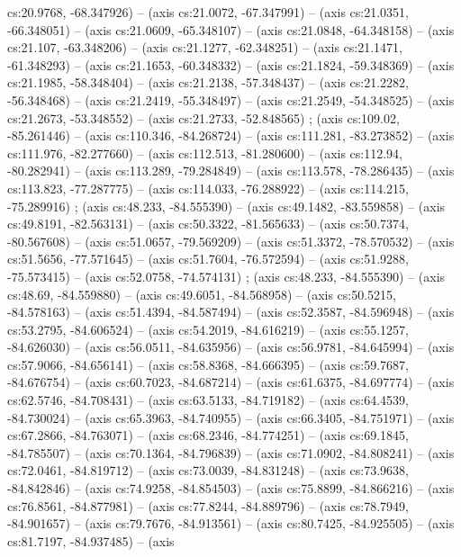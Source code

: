   cs:20.9768, -68.347926) -- (axis cs:21.0072, -67.347991) -- (axis
  cs:21.0351, -66.348051) -- (axis cs:21.0609, -65.348107) -- (axis
  cs:21.0848, -64.348158) -- (axis cs:21.107, -63.348206) -- (axis cs:21.1277,
  -62.348251) -- (axis cs:21.1471, -61.348293) -- (axis cs:21.1653,
  -60.348332) -- (axis cs:21.1824, -59.348369) -- (axis cs:21.1985,
  -58.348404) -- (axis cs:21.2138, -57.348437) -- (axis cs:21.2282,
  -56.348468) -- (axis cs:21.2419, -55.348497) -- (axis cs:21.2549,
  -54.348525) -- (axis cs:21.2673, -53.348552) -- (axis cs:21.2733,
  -52.848565) ;  (axis cs:109.02, -85.261446) --
  (axis cs:110.346, -84.268724) -- (axis cs:111.281, -83.273852) -- (axis
  cs:111.976, -82.277660) -- (axis cs:112.513, -81.280600) -- (axis cs:112.94,
  -80.282941) -- (axis cs:113.289, -79.284849) -- (axis cs:113.578,
  -78.286435) -- (axis cs:113.823, -77.287775) -- (axis cs:114.033,
  -76.288922) -- (axis cs:114.215, -75.289916) ; 
  (axis cs:48.233, -84.555390) -- (axis cs:49.1482, -83.559858) -- (axis
  cs:49.8191, -82.563131) -- (axis cs:50.3322, -81.565633) -- (axis
  cs:50.7374, -80.567608) -- (axis cs:51.0657, -79.569209) -- (axis
  cs:51.3372, -78.570532) -- (axis cs:51.5656, -77.571645) -- (axis
  cs:51.7604, -76.572594) -- (axis cs:51.9288, -75.573415) -- (axis
  cs:52.0758, -74.574131) ;  (axis cs:48.233,
  -84.555390) -- (axis cs:48.69, -84.559880) -- (axis cs:49.6051, -84.568958)
  -- (axis cs:50.5215, -84.578163) -- (axis cs:51.4394, -84.587494) -- (axis
  cs:52.3587, -84.596948) -- (axis cs:53.2795, -84.606524) -- (axis
  cs:54.2019, -84.616219) -- (axis cs:55.1257, -84.626030) -- (axis
  cs:56.0511, -84.635956) -- (axis cs:56.9781, -84.645994) -- (axis
  cs:57.9066, -84.656141) -- (axis cs:58.8368, -84.666395) -- (axis
  cs:59.7687, -84.676754) -- (axis cs:60.7023, -84.687214) -- (axis
  cs:61.6375, -84.697774) -- (axis cs:62.5746, -84.708431) -- (axis
  cs:63.5133, -84.719182) -- (axis cs:64.4539, -84.730024) -- (axis
  cs:65.3963, -84.740955) -- (axis cs:66.3405, -84.751971) -- (axis
  cs:67.2866, -84.763071) -- (axis cs:68.2346, -84.774251) -- (axis
  cs:69.1845, -84.785507) -- (axis cs:70.1364, -84.796839) -- (axis
  cs:71.0902, -84.808241) -- (axis cs:72.0461, -84.819712) -- (axis
  cs:73.0039, -84.831248) -- (axis cs:73.9638, -84.842846) -- (axis
  cs:74.9258, -84.854503) -- (axis cs:75.8899, -84.866216) -- (axis
  cs:76.8561, -84.877981) -- (axis cs:77.8244, -84.889796) -- (axis
  cs:78.7949, -84.901657) -- (axis cs:79.7676, -84.913561) -- (axis
  cs:80.7425, -84.925505) -- (axis cs:81.7197, -84.937485) -- (axis
